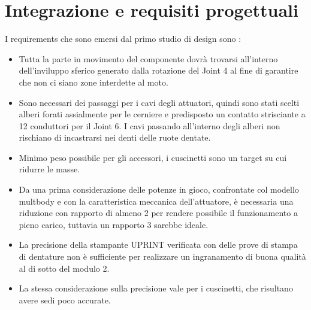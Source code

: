 \documentclass[%
corpo=11pt,
twoside,
 stile=classica,
oldstyle,
greek,%
]{toptesi}
\begin{document}
	\section{Integrazione e requisiti progettuali}
	I requirements che sono emersi dal primo studio di design sono :
	\begin{itemize}
		\item Tutta la parte in movimento del componente dovrà trovarsi all'interno dell'inviluppo sferico generato dalla rotazione del Joint 4 al fine di garantire che non ci siano zone interdette al moto.
		
		\item Sono necessari dei passaggi per i cavi degli attuatori, quindi sono stati scelti alberi forati assialmente per le cerniere e predisposto un contatto strisciante a 12 conduttori per il Joint 6. I cavi passando all'interno degli alberi non rischiano di incastrarsi nei denti delle ruote dentate. 
		\item Minimo peso possibile per gli accessori, i cuscinetti sono un target su cui ridurre le masse.
		\item Da una prima considerazione delle potenze in gioco, confrontate col modello multbody e con la caratteristica meccanica dell'attuatore, è necessaria una riduzione con rapporto di almeno 2 per rendere possibile il funzionamento a pieno carico, tuttavia un rapporto 3 sarebbe ideale. 
		\item La precisione della stampante UPRINT verificata con delle prove di stampa di dentature non è sufficiente per realizzare un ingranamento di buona qualità al di sotto del modulo 2. 
		\item La stessa considerazione sulla precisione vale per i cuscinetti, che risultano avere sedi poco accurate. 
		
	\end{itemize}
	
	
\end{document}

